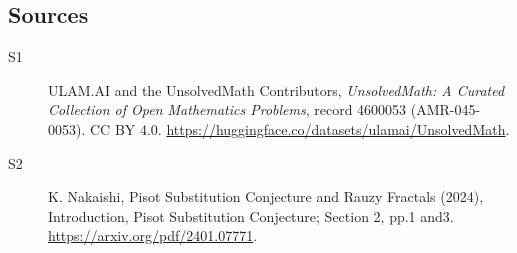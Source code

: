 \documentclass[11pt]{article}
\begin{document}
\subsection{Sources}
\begin{description}
\item[\hypertarget{source:4600053:1}{S1}] ULAM.AI and the UnsolvedMath Contributors, \emph{UnsolvedMath: A Curated Collection of Open Mathematics Problems}, record 4600053 (AMR-045-0053). CC BY 4.0. \url{https://huggingface.co/datasets/ulamai/UnsolvedMath}.
\item[\hypertarget{source:4600053:2}{S2}] K. Nakaishi, Pisot Substitution Conjecture and Rauzy Fractals (2024), Introduction, Pisot Substitution Conjecture; Section 2, pp.1 and3. \url{https://arxiv.org/pdf/2401.07771}.
\end{description}
\label{end:4600053}
\end{document}
